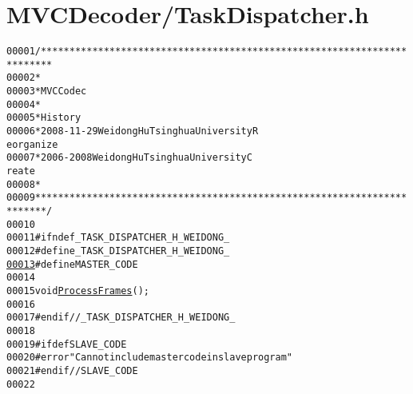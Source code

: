 \hypertarget{_task_dispatcher_8h_source}{
\section{MVCDecoder/TaskDispatcher.h}
}


\begin{footnotesize}\begin{alltt}
00001 \textcolor{comment}{/************************************************************************}
00002 \textcolor{comment}{ *}
00003 \textcolor{comment}{ * MVC Codec}
00004 \textcolor{comment}{ * }
00005 \textcolor{comment}{ * History}
00006 \textcolor{comment}{ * 2008-11-29           Weidong Hu              Tsinghua University             R
      eorganize}
00007 \textcolor{comment}{ * 2006-2008            Weidong Hu              Tsinghua University             C
      reate}
00008 \textcolor{comment}{ * }
00009 \textcolor{comment}{ ************************************************************************/}
00010 
00011 \textcolor{preprocessor}{#ifndef \_TASK\_DISPATCHER\_H\_WEIDONG\_}
00012 \textcolor{preprocessor}{}\textcolor{preprocessor}{#define \_TASK\_DISPATCHER\_H\_WEIDONG\_}
\hypertarget{_task_dispatcher_8h_source_l00013}{}\hyperlink{_task_dispatcher_8h_aac0db9a0280340fa820b89366c85d392}{00013} \textcolor{preprocessor}{}\textcolor{preprocessor}{#define MASTER\_CODE}
00014 \textcolor{preprocessor}{}
00015 \textcolor{keywordtype}{void} \hyperlink{_task_dispatcher_8cpp_a1d60dff3d8b50942f03375c11e724af2}{ProcessFrames}();
00016 
00017 \textcolor{preprocessor}{#endif //\_TASK\_DISPATCHER\_H\_WEIDONG\_}
00018 \textcolor{preprocessor}{}
00019 \textcolor{preprocessor}{#ifdef SLAVE\_CODE}
00020 \textcolor{preprocessor}{}\textcolor{preprocessor}{#error "Can not include master code in slave program"}
00021 \textcolor{preprocessor}{}\textcolor{preprocessor}{#endif // SLAVE\_CODE}
00022 \textcolor{preprocessor}{}
\end{alltt}\end{footnotesize}
